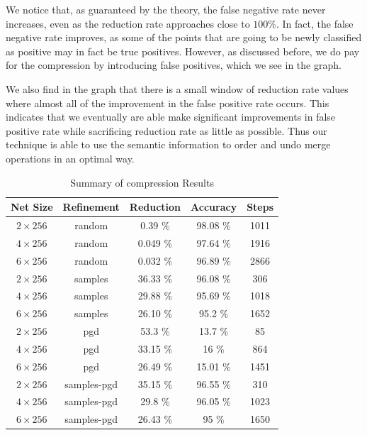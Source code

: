 We notice that, as guaranteed by the theory, the false negative rate never
increases, even as the reduction rate approaches close to $100\%$. In fact, the
false negative rate improves, as some of the points that are going
to be newly classified as positive may in fact be true positives.  
However, as discussed before, we do pay for the compression by introducing false
positives, which we see in the graph. 

We also find in the graph that there is a
small window of reduction rate values where almost all of the improvement in the
false positive rate occurs. This indicates that we eventually are able make 
significant improvements in false positive rate while sacrificing reduction rate
as little as possible. Thus our technique is able to use the semantic
information to order and undo merge operations in an optimal way.

\begin{table}
\begin{tabular}{|c|c|c|c|c|}
\hline
Net Size     & Refinement  & Reduction & Accuracy & Steps  \\ 
\hline
$2\times256$ & random      & 0.39   \%  &  98.08 \%  &   1011 \\ 
$4\times256$ & random      & 0.049   \%   & 97.64  \%  &   1916 \\ 
$6\times256$ & random      & 0.032   \%   & 96.89 \%  &   2866 \\ 
$2\times256$ & samples     & 36.33 \%   & 96.08 \%  &     306 \\ 
$4\times256$ & samples     & 29.88 \%   & 95.69 \%  &   1018 \\ 
$6\times256$ & samples     & 26.10 \%   & 95.2 \%  &   1652 \\ 
$2\times256$ & pgd         & 53.3 \%   & 13.7 \%  &     85 \\ 
$4\times256$ & pgd         & 33.15 \%   & 16 \%  &      864 \\ 
$6\times256$ & pgd         & 26.49 \%   & 15.01 \%  &   1451 \\ 
$2\times256$ & samples-pgd & 35.15 \%   & 96.55 \%  &    310 \\ 
$4\times256$ & samples-pgd & 29.8 \%   & 96.05 \%  &   1023 \\ 
$6\times256$ & samples-pgd & 26.43 \%   & 95 \%  &   1650 \\ 
\hline
\end{tabular}
\caption{Summary of \mnist compression Results }
\label{t:mnist-compr-summary}
\end{table}

